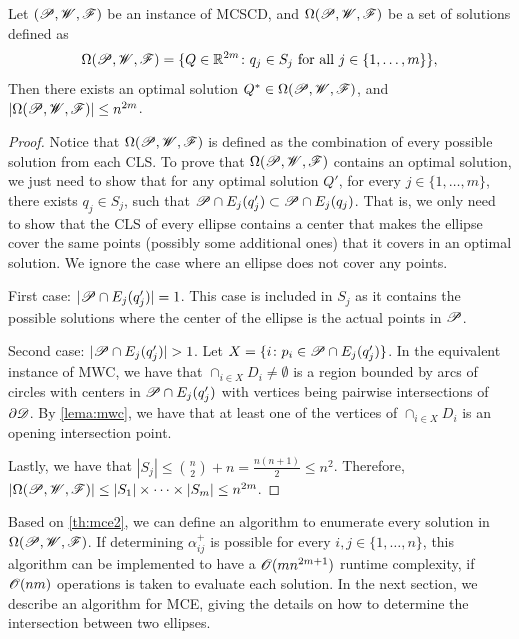 \begin{theorem}\label{th:mce2}
	Let $(\mathscr{P}, \mathscr{W}, \mathscr{F})$ be an instance of MCSCD, and $\Omega(\mathscr{P}, \mathscr{W}, \mathscr{F})$ be a set of solutions defined as 
	\begin{equation*}\label{eq:omega2}
		\Omega(\mathscr{P}, \mathscr{W}, \mathscr{F}) = \{Q\in \mathbb{R}^{2m} \colon q_j \in S_j \textnormal{ for all } j\in\{1, \dots, m\}\},
	\end{equation*}
	Then there exists an optimal solution $Q^*\in \Omega(\mathscr{P}, \mathscr{W}, \mathscr{F})$, and $|\Omega(\mathscr{P}, \mathscr{W}, \mathscr{F})|\le n^{2m}$.
\end{theorem}
\begin{proof}
		Notice that $\Omega(\mathscr{P}, \mathscr{W}, \mathscr{F})$ is defined as the combination of every possible solution from each CLS. 
		To prove that $\Omega(\mathscr{P}, \mathscr{W}, \mathscr{F})$ contains an optimal solution, we just need to show that for any optimal solution $Q'$, for every $j \in \{1, \dots, m\}$, there exists $q_j \in S_j$, such that $\mathscr{P} \cap E_j(q_j') \subset \mathscr{P} \cap E_j(q_j)$.
		That is, we only need to show that the CLS of every ellipse contains a center that makes the ellipse cover the same points (possibly some additional ones) that it covers in an optimal solution.
		We ignore the case where an ellipse does not cover any points.
		
		First case: $|\mathscr{P} \cap E_j(q_j')|=1$. This case is included in $S_j$ as it contains the possible solutions where the center of the ellipse is the actual points in $\mathscr{P}$.
		
		Second case: $|\mathscr{P} \cap E_j(q_j')| > 1$. Let $X = \{i \colon p_i \in \mathscr{P} \cap E_j(q_j')\}$. In the equivalent instance of MWC, we have that $\cap_{i\in X} D_i \neq \emptyset$ is a region bounded by arcs of circles with centers in $\mathscr{P} \cap E_j(q_j')$ with vertices being pairwise intersections of $\partial \mathscr{D}$. By \autoref{lema:mwc}, we have that at least one of the vertices of $\cap_{i\in X} D_i$ is an opening intersection point.
		
		Lastly, we have that $|S_j| \le \binom{n}{2} + n = \frac{n(n+1)}{2} \le n^2$. Therefore,
		$|\Omega(\mathscr{P}, \mathscr{W}, \mathscr{F})| \le |S_1|\times \dots \times |S_m| \le n^{2m}$.
\end{proof}

Based on \autoref{th:mce2}, we can define an algorithm to enumerate every solution in $\Omega(\mathscr{P}, \mathscr{W}, \mathscr{F})$. If determining $\alpha_{ij}^+$ is possible for every $i, j \in \{1, \dots, n\}$, this algorithm can be implemented to have a $\mathscr{O}(mn^{2m+1})$ runtime complexity, if $\mathscr{O}(nm)$ operations is taken to evaluate each solution.
In the next section, we describe an algorithm for MCE, giving the details on how to determine the intersection between two ellipses.

